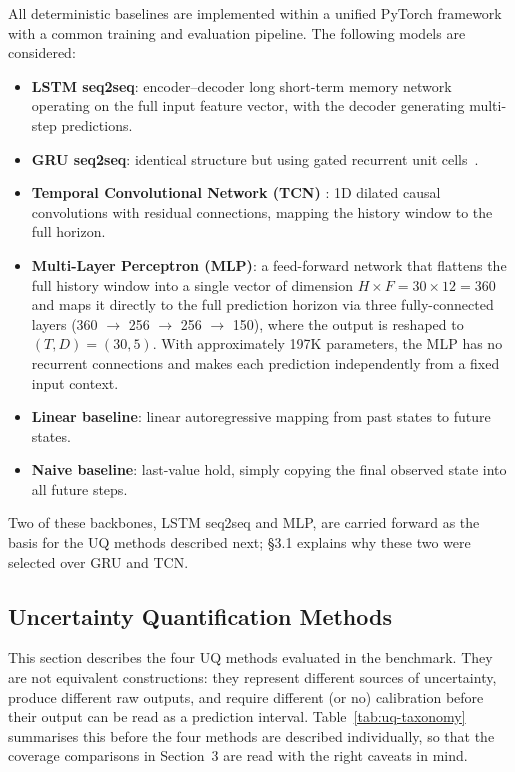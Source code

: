 \documentclass[a4paper,fleqn]{cas-sc}
\begin{document}
All deterministic baselines are implemented within a unified PyTorch framework with a common training and evaluation pipeline. The following models are considered:
\begin{itemize}
    \item \textbf{LSTM seq2seq}: encoder--decoder long short-term memory network~\cite{hochreiter1997lstm} operating on the full input feature vector, with the decoder generating multi-step predictions.
    \item \textbf{GRU seq2seq}: identical structure but using gated recurrent unit cells~\cite{cho2014gru}.
    \item \textbf{Temporal Convolutional Network (TCN)} \cite{bai2018tcn}: 1D dilated causal convolutions with residual connections, mapping the history window to the full horizon.
    \item \textbf{Multi-Layer Perceptron (MLP)}: a feed-forward network that flattens
the full history window into a single vector of dimension $H \times F = 30 \times 12 = 360$
and maps it directly to the full prediction horizon via three fully-connected layers
(360 $\to$ 256 $\to$ 256 $\to$ 150), where the output is reshaped to $(T, D) = (30, 5)$.
With approximately 197K parameters, the MLP has no recurrent connections and makes
each prediction independently from a fixed input context.
    \item \textbf{Linear baseline}: linear autoregressive mapping from past states to future states.
    \item \textbf{Naive baseline}: last-value hold, simply copying the final observed state into all future steps.
\end{itemize}
Two of these backbones, LSTM seq2seq and MLP, are carried forward as the basis for the UQ methods described next; §3.1 explains why these two were selected over GRU and TCN.

\subsection{Uncertainty Quantification Methods}
\label{sec:uq-methods}

This section describes the four UQ methods evaluated in the benchmark. They are not equivalent constructions: they represent different sources of uncertainty, produce different raw outputs, and require different (or no) calibration before their output can be read as a prediction interval. Table~\ref{tab:uq-taxonomy} summarises this before the four methods are described individually, so that the coverage comparisons in Section~3 are read with the right caveats in mind.
\end{document}
